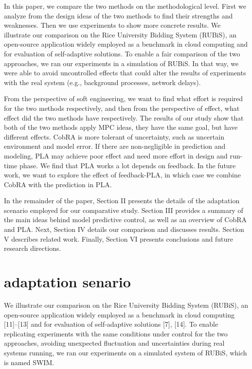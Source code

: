 \documentclass[sigconf]{acmart}
\begin{document}
In this paper, we compare the two methods on the methodological level. First we analyze from the design ideas of the two methods to find their strengths and weaknesses. Then we use experiments to show more concrete results. We illustrate our comparison on the Rice University Bidding System (RUBiS), an open-source application widely employed as a benchmark in cloud computing and for evaluation of self-adaptive solutions. To enable a fair comparison of the two approaches, we ran our experiments in a simulation of RUBiS. In that way, we were able to avoid uncontrolled effects that could alter the results of experiments with the real system (e.g., background processes, network delays).

From the perspective of soft engineering, we want to find what effort is required for the two methods respectively, and then from the perspective of effect, what effect did the two methods have respectively. The results of our study show that both of the two methods apply MPC ideas, they have the same goal, but have different effects. CobRA is more tolerant of uncertainty, such as uncertain environment and model error. If there are non-negligible in prediction and modeling, PLA may achieve poor effect and need more effort in design and run-time phase. We find that PLA works a lot depends on feedback. In the future work, we want to explore the effect of feedback-PLA, in which case we combine CobRA with the prediction in PLA.

In the remainder of the paper, Section II presents the details of the adaptation scenario employed for our comparative study. Section III provides a summary of the main ideas behind model predictive control, as well as an overview of CobRA and PLA. Next, Section IV details our comparison and discusses results. Section V describes related work. Finally, Section VI presents conclusions and future research directions. 

\section{adaptation senario}

We illustrate our comparison on the Rice University Bidding System (RUBiS)\cite{rubis}, an open-source application widely employed as a benchmark in cloud computing [11]–[13] and for evaluation of self-adaptive solutions [7], [14]. 
To enable replicating experiments with the same conditions under control for the two approaches, avoiding unexpected fluctuation and uncertainties during real systems running, we ran our experiments on a simulated system of RUBiS, which is named SWIM.
\end{document}
